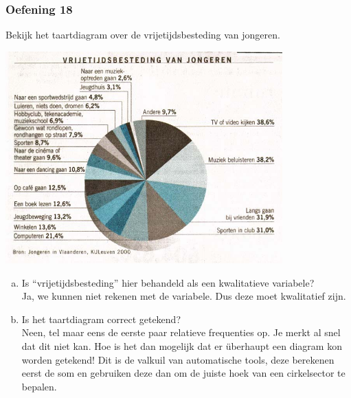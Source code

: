 \documentclass[13pt]{beamer}
\newenvironment{answer}
{\color{blue}}
{\color{black}}
\begin{document}
\begin{frame}
  \frametitle{Oefening 18}
  \begin{minipage}{0.35\linewidth}
    Bekijk het taartdiagram over de vrijetijdsbesteding van jongeren.
  \end{minipage}
  \begin{minipage}{0.6\linewidth}
    \vspace*{-1cm}
    \begin{center}
      \includegraphics[width=0.8\textwidth]{cirkeldiagram-vrijetijdsbesteding}
    \end{center}
  \end{minipage}
  \begin{enumerate}[(a)]
  \item Is “vrijetijdsbesteding” hier behandeld als een kwalitatieve variabele?\\
    \begin{answer}
      Ja, we kunnen niet rekenen met de variabele. Dus deze moet kwalitatief zijn.
    \end{answer}
  \item Is het taartdiagram correct getekend?\\
    \begin{answer}
      Neen, tel maar eens de eerste paar relatieve frequenties op. Je merkt al snel dat dit niet kan. Hoe is het dan mogelijk dat er überhaupt een diagram kon worden getekend! Dit is de valkuil van automatische tools, deze berekenen eerst de som en gebruiken deze dan om de juiste hoek van een cirkelsector te bepalen.
    \end{answer}
  \end{enumerate}

\end{frame}
\end{document}
